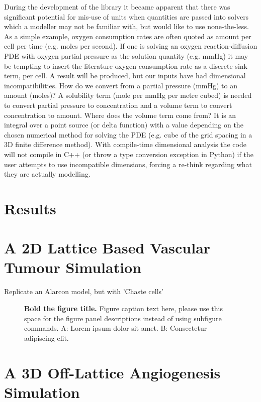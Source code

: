 \documentclass[10pt,letterpaper]{article}
\begin{document}
During the development of the library it became apparent that there was significant potential for mis-use of units when quantities are passed into solvers which a modeller may not be familiar with, but would like to use none-the-less. As a simple example, oxygen consumption rates are often quoted as amount per cell per time (e.g. moles per second). If one is solving an oxygen reaction-diffusion PDE with oxygen partial pressure as the solution quantity (e.g. mmHg) it may be tempting to insert the literature oxygen consumption rate as a discrete sink term, per cell. A result will be produced, but our inputs have had dimensional incompatibilities. How do we convert from a partial pressure (mmHg) to an amount (moles)? A solubility term (mole per mmHg per metre cubed) is needed to convert partial pressure to concentration and a volume term to convert concentration to amount. Where does the volume term come from? It is an integral over a point source (or delta function) with a value depending on the chosen numerical method for solving the PDE (e.g. cube of the grid spacing in a 3D finite difference method). With compile-time dimensional analysis the code will not compile in C++ (or throw a type conversion exception in Python) if the user attempts to use incompatible dimensions, forcing a re-think regarding what they are actually modelling. 


\section*{Results}

\section*{A 2D Lattice Based Vascular Tumour Simulation}

Replicate an Alarcon model, but with 'Chaste cells'

\begin{figure}[!h]
\caption{{\bf Bold the figure title.}
Figure caption text here, please use this space for the figure panel descriptions instead of using subfigure commands. A: Lorem ipsum dolor sit amet. B: Consectetur adipiscing elit.}
\label{fig1}
\end{figure}


\section*{A 3D Off-Lattice Angiogenesis Simulation}
\end{document}
